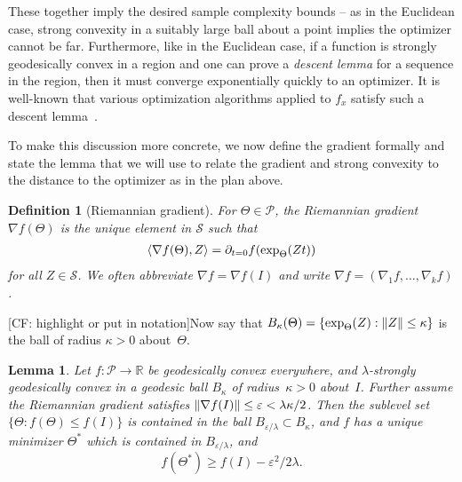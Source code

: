 \documentclass{article}
\newtheorem{lemma}[theorem]{Lemma}
\newtheorem{definition}{Definition}
\DeclarePairedDelimiter{\norm}{\lVert}{\rVert}
\newcommand{\R}{{\mathbb{R}}}
\newcommand\eps{\varepsilon}
\newcommand\Sym{\mathcal{S}}
\newcommand\SPD{\mathcal{P}}
\newcommand\samp{x}
\newcommand{\CF}[1]{{\color{purple}[CF: #1]}}
\newcommand{\RMO}[1]{{\color{red}[RMO: #1]}}
\begin{document}
These together imply the desired sample complexity bounds -- as in the Euclidean case, strong convexity in a suitably large ball about a point implies the optimizer cannot be far.
Furthermore, like in the Euclidean case, if a function is strongly geodesically convex in a region and one can prove a \emph{descent lemma} for a sequence in the region, then it must converge exponentially quickly to an optimizer.
It is well-known that various optimization algorithms applied to $f_{\samp}$ satisfy such a descent lemma~\cite{burgisser2019towards}.

To make this discussion more concrete, we now define the gradient formally and state the lemma that we will use to relate the gradient and strong convexity to the distance to the optimizer as in the plan above.

\begin{definition}[Riemannian gradient]
For $\Theta \in \SPD$, the \emph{Riemannian gradient}~$\nabla f(\Theta)$ is the unique element in $\Sym$ such that
\begin{align*}
  \braket{\nabla f(\Theta), Z} = \partial_{t=0} f(\exp_{\Theta}(Zt))
\end{align*}
for all $Z\in \Sym$.
We often abbreviate $\nabla f = \nabla f(I)$ and write $\nabla f = (\nabla_1 f, \dots, \nabla_k f)$.
\end{definition}

\noindent
\CF{highlight or put in notation}Now say that $B_\kappa(\Theta) = \{ \exp_{\Theta}(Z) : \norm Z \leq \kappa \}$ is the ball of radius $\kappa>0$ about~$\Theta$.

\begin{lemma}\label{lem:convex-ball}
Let $f\colon \SPD\to \R$ be geodesically convex everywhere, and $\lambda$-strongly geodesically convex in a geodesic ball $B_\kappa$ of radius~$\kappa>0$ about~$I$.
Further assume the Riemannian gradient satisfies $\norm{\nabla f(I)} \leq \eps < \lambda \kappa / 2$.
Then the sublevel set $\{\Theta:f(\Theta) \leq f(I)\}$ is contained in the ball $B_{\eps/\lambda} \subset B_\kappa$, and $f$ has a unique minimizer $\Theta^*$ which is contained in $B_{\eps/\lambda}$, and 
$$ f(\Theta^*) \geq f(I) - \eps^2/2 \lambda.$$
\end{lemma}

\end{document}

